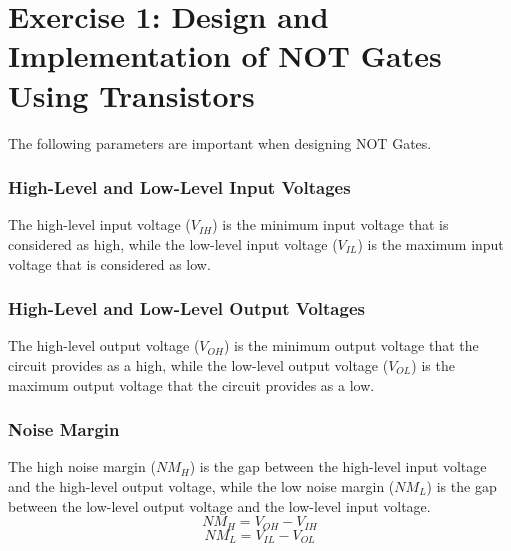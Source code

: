 
%





\section{\color{olive}Exercise 1: Design and Implementation of NOT Gates Using Transistors} %

The following parameters are important when designing NOT Gates.

\subsubsection{\color{red}High-Level and Low-Level Input Voltages}
The high-level input voltage ($V_{IH}$) is the minimum input voltage that is considered as high, while the low-level input voltage ($V_{IL}$)  is the maximum input voltage that is considered as low.

\subsubsection{\color{red}High-Level and Low-Level Output Voltages}
The high-level output voltage ($V_{OH}$) is the minimum output voltage that the circuit provides as a high, while the low-level output voltage ($V_{OL}$) is the maximum output voltage that the circuit provides as a low.

\subsubsection{\color{red}Noise Margin}
The high noise margin ($NM_{H}$) is the gap between the high-level input voltage and the high-level output voltage, while the low noise margin ($NM_{L}$) is the gap between the low-level output voltage and the low-level input voltage.
$$NM_{H} = V_{OH} - V_{IH}$$
$$NM_{L} = V_{IL} - V_{OL}$$

